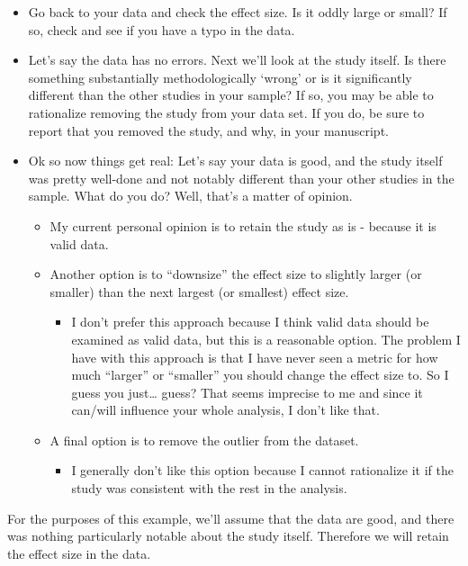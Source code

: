 \documentclass[
]{book}
\providecommand{\tightlist}{%
  \setlength{\itemsep}{0pt}\setlength{\parskip}{0pt}}
\begin{document}
\begin{itemize}
\item
  Go back to your data and check the effect size. Is it oddly large or small? If so, check and see if you have a typo in the data.
\item
  Let's say the data has no errors. Next we'll look at the study itself. Is there something substantially methodologically `wrong' or is it significantly different than the other studies in your sample? If so, you may be able to rationalize removing the study from your data set. If you do, be sure to report that you removed the study, and why, in your manuscript.
\item
  Ok so now things get real: Let's say your data is good, and the study itself was pretty well-done and not notably different than your other studies in the sample. What do you do? Well, that's a matter of opinion.

  \begin{itemize}
  \item
    My current personal opinion is to retain the study as is - because it is valid data.
  \item
    Another option is to ``downsize'' the effect size to slightly larger (or smaller) than the next largest (or smallest) effect size.

    \begin{itemize}
    \tightlist
    \item
      I don't prefer this approach because I think valid data should be examined as valid data, but this is a reasonable option. The problem I have with this approach is that I have never seen a metric for how much ``larger'' or ``smaller'' you should change the effect size to. So I guess you just\ldots{} guess? That seems imprecise to me and since it can/will influence your whole analysis, I don't like that.
    \end{itemize}
  \item
    A final option is to remove the outlier from the dataset.

    \begin{itemize}
    \tightlist
    \item
      I generally don't like this option because I cannot rationalize it if the study was consistent with the rest in the analysis.
    \end{itemize}
  \end{itemize}
\end{itemize}

For the purposes of this example, we'll assume that the data are good, and there was nothing particularly notable about the study itself. Therefore we will retain the effect size in the data.
\end{document}
